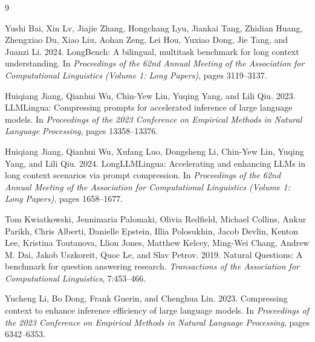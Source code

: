 \documentclass[10pt,a4paper,twocolumn]{article}
\begin{document}

\begin{thebibliography}{9}

Yushi Bai, Xin Lv, Jiajie Zhang, Hongchang Lyu, Jiankai Tang, Zhidian Huang, Zhengxiao Du, Xiao Liu, Aohan Zeng, Lei Hou, Yuxiao Dong, Jie Tang, and Juanzi Li. 2024.
\newblock LongBench: A bilingual, multitask benchmark for long context understanding.
\newblock In \emph{Proceedings of the 62nd Annual Meeting of the Association for Computational Linguistics (Volume 1: Long Papers)}, pages 3119--3137.

Huiqiang Jiang, Qianhui Wu, Chin-Yew Lin, Yuqing Yang, and Lili Qiu. 2023.
\newblock LLMLingua: Compressing prompts for accelerated inference of large language models.
\newblock In \emph{Proceedings of the 2023 Conference on Empirical Methods in Natural Language Processing}, pages 13358--13376.

Huiqiang Jiang, Qianhui Wu, Xufang Luo, Dongsheng Li, Chin-Yew Lin, Yuqing Yang, and Lili Qiu. 2024.
\newblock LongLLMLingua: Accelerating and enhancing LLMs in long context scenarios via prompt compression.
\newblock In \emph{Proceedings of the 62nd Annual Meeting of the Association for Computational Linguistics (Volume 1: Long Papers)}, pages 1658--1677.

Tom Kwiatkowski, Jennimaria Palomaki, Olivia Redfield, Michael Collins, Ankur Parikh, Chris Alberti, Danielle Epstein, Illia Polosukhin, Jacob Devlin, Kenton Lee, Kristina Toutanova, Llion Jones, Matthew Kelcey, Ming-Wei Chang, Andrew M. Dai, Jakob Uszkoreit, Quoc Le, and Slav Petrov. 2019.
\newblock Natural Questions: A benchmark for question answering research.
\newblock \emph{Transactions of the Association for Computational Linguistics}, 7:453--466.

Yucheng Li, Bo Dong, Frank Guerin, and Chenghua Lin. 2023.
\newblock Compressing context to enhance inference efficiency of large language models.
\newblock In \emph{Proceedings of the 2023 Conference on Empirical Methods in Natural Language Processing}, pages 6342--6353.


\end{thebibliography}
\end{document}
